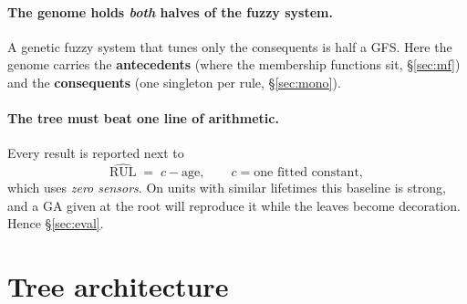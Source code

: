 \documentclass[11pt,a4paper]{article}
\newcommand{\code}[1]{\texttt{\detokenize{#1}}}
\begin{document}
\paragraph{The genome holds \emph{both} halves of the fuzzy system.} A genetic fuzzy
system that tunes only the consequents is half a GFS. Here the genome carries the
\textbf{antecedents} (where the membership functions sit, \S\ref{sec:mf}) and the
\textbf{consequents} (one singleton per rule, \S\ref{sec:mono}).

\paragraph{The tree must beat one line of arithmetic.} Every result is reported next
to
\[
  \widehat{\mathrm{RUL}} \;=\; c-\mathrm{age},
  \qquad c=\text{one fitted constant},
\]
which uses \emph{zero sensors}. On units with similar lifetimes this baseline is
strong, and a GA given \code{age} at the root will reproduce it while the leaves
become decoration. Hence \S\ref{sec:eval}.

\section{Tree architecture}
\end{document}
